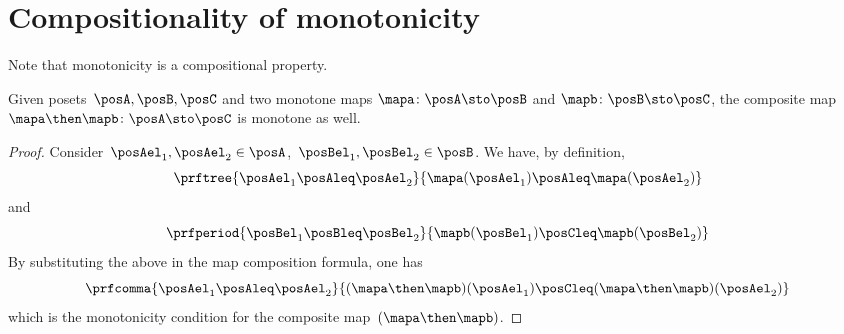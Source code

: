 
\section{Compositionality of monotonicity}
Note that monotonicity is a compositional property.
\begin{lemma}
    Given posets~$\posA,\posB,\posC$ and two monotone maps $\mapa\colon \posA \sto \posB$ and $\mapb\colon \posB \sto \posC$, the composite map $\mapa\then \mapb\colon \posA \sto \posC$ is monotone as well.
\end{lemma}
\begin{proof}
    Consider~$\posAel_1,\posAel_2 \in \posA$,~$\posBel_1,\posBel_2\in \posB$.
    We have, by definition,
    \begin{equation*}
        \prftree{\posAel_1\posAleq \posAel_2}{\mapa(\posAel_1)\posAleq \mapa(\posAel_2)}
    \end{equation*}
    and
    \begin{equation*}
        \prfperiod{\posBel_1\posBleq \posBel_2}{\mapb(\posBel_1)\posCleq \mapb(\posBel_2)}
    \end{equation*}
    By substituting the above in the map composition formula, one has
    \begin{equation}
        \prfcomma{\posAel_1\posAleq \posAel_2 }{ (\mapa\then \mapb)(\posAel_1) \posCleq (\mapa\then \mapb)(\posAel_2)}
    \end{equation}
    which is the monotonicity condition for the composite map~$(\mapa\then \mapb)$.
\end{proof}
